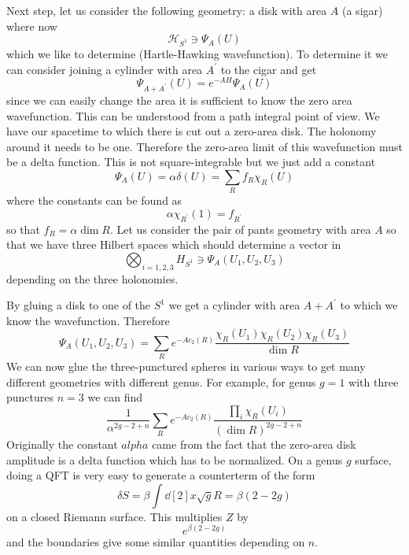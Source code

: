 \documentclass[11pt]{article}
\theoremstyle{definition}
\numberwithin{equation}{section}
\newcommand*\cH{\mathcal{H}}
\begin{document}
Next step, let us consider the following geometry: a disk with area $A$ (a sigar) where now
\begin{equation}
	\cH_{S^1}\ni \Psi_A(U)
\end{equation}
which we like to determine (Hartle-Hawking wavefunction). To determine it we can consider joining a cylinder with area $A^\prime$ to the cigar and get
\begin{equation}
	\Psi_{A+A^\prime}(U)=e^{-A H}\Psi_A(U)
\end{equation}
since we can easily change the area it is sufficient to know the zero area wavefunction. This can be understood from a path integral point of view. We have our spacetime to which there is cut out a zero-area disk. The holonomy around it needs to be one. Therefore the zero-area limit of this wavefunction must be a delta function. This is not square-integrable but we just add a constant
\begin{equation}
	\Psi_A(U)=\alpha\delta(U)=\sum_R f_R\chi_R(U)
\end{equation}
where the constants can be found as
\begin{equation}
	\alpha\chi_{R^\prime}(1)=f_{R^\prime}
\end{equation}
so that $f_R=\alpha \dim R$. Let us consider the pair of pants geometry with area $A$ so that we have three Hilbert spaces which should determine a vector in 
\begin{equation}
	\bigotimes_{i=1,2,3} H_{S^1}\ni \Psi_A(U_1,U_2,U_3)
\end{equation}
depending on the three holonomies.

By gluing a disk to one of the $S^1$ we get a cylinder with area $A+A^\prime$ to which we know the wavefunction. Therefore 
\begin{equation}
	\Psi_A(U_1,U_2,U_3)=\sum_R e^{-A c_2(R)}\frac{\chi_R(U_1)\chi_R(U_2)\chi_R(U_3)}{\dim R}
\end{equation}
We can now glue the three-punctured spheres in various ways to get many different geometries with different genus. For example, for genus $g=1$ with three punctures $n=3$ we can find 
\begin{equation}
	\frac{1}{\alpha^{2g-2+n}}\sum_R e^{-A c_2(R)}\frac{\prod_i \chi_R(U_i)}{(\dim R)^{2g-2+n}}
\end{equation}
Originally the constant $alpha$ came from the fact that the zero-area disk amplitude is a delta function which has to be normalized. On a genus $g$ surface, doing a QFT is very easy to generate a counterterm of the form 
\begin{equation}
	\delta S=\beta\int \dd[2]{x}\sqrt{g}R=\beta (2-2g)
\end{equation}
on a closed Riemann surface. This multiplies $Z$ by 
\begin{equation}
	e^{\beta(2-2g)}
\end{equation}
and the boundaries give some similar quantities depending on $n$. 
\end{document}
